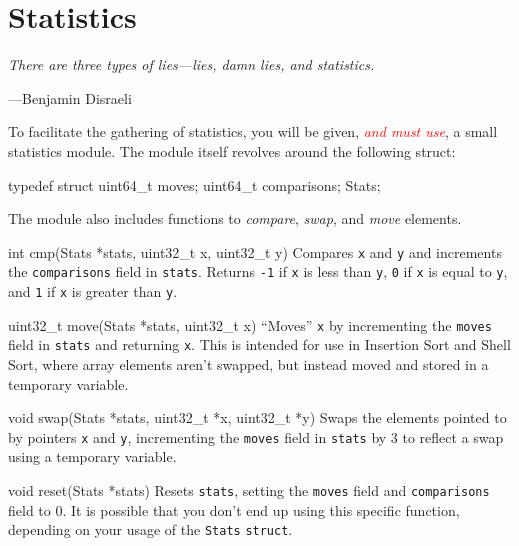 \section{Statistics}
\epigraph{\emph{There are three types of lies---lies, damn lies, and statistics.}}{%
---Benjamin Disraeli}

\noindent
To facilitate the gathering of statistics, you will be given,
\textcolor{red}{\emph{and must use}}, a small statistics module. The
module itself revolves around the following struct:

\begin{clisting}{}
typedef struct {
  uint64_t moves;
  uint64_t comparisons;
} Stats;
\end{clisting}

The module also includes functions to \emph{compare}, \emph{swap}, and
\emph{move} elements.

\begin{funcdoc}{int cmp(Stats *stats, uint32\_t x, uint32\_t y)}
  Compares \texttt{x} and \texttt{y} and increments the
  \texttt{comparisons} field in \texttt{stats}. Returns \texttt{-1} if
  \texttt{x} is less than \texttt{y}, \texttt{0} if \texttt{x} is equal
  to \texttt{y}, and \texttt{1} if \texttt{x} is greater than
  \texttt{y}.
\end{funcdoc}

\begin{funcdoc}{uint32\_t move(Stats *stats, uint32\_t x)}
  ``Moves'' \texttt{x} by incrementing the \texttt{moves} field in
  \texttt{stats} and returning \texttt{x}. This is intended for use in
  Insertion Sort and Shell Sort, where array elements aren't swapped,
  but instead moved and stored in a temporary variable.
\end{funcdoc}

\begin{funcdoc}{void swap(Stats *stats, uint32\_t *x, uint32\_t *y)}
  Swaps the elements pointed to by pointers \texttt{x} and \texttt{y},
  incrementing the \texttt{moves} field in \texttt{stats} by 3 to
  reflect a swap using a temporary variable.
\end{funcdoc}

\begin{funcdoc}{void reset(Stats *stats)}
  Resets \texttt{stats}, setting the \texttt{moves} field and
  \texttt{comparisons} field to 0. It is possible that you don't end up
  using this specific function, depending on your usage of the
  \texttt{Stats} \texttt{struct}.
\end{funcdoc}
